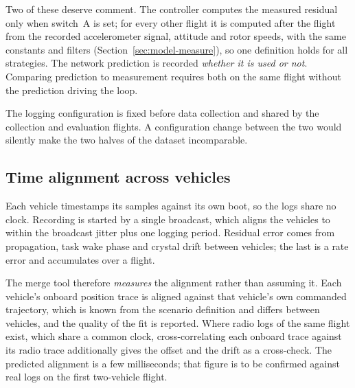 Two of these deserve comment. The controller computes the measured residual only when switch~A is
set; for every other flight it is computed after the flight from the recorded accelerometer signal,
attitude and rotor speeds, with the same constants and filters (Section~\ref{sec:model-measure}),
so one definition holds for all strategies. The network prediction is recorded \emph{whether it is
used or not}. Comparing prediction to measurement requires both on the same flight without the
prediction driving the loop.

The logging configuration is fixed before data collection and shared by the collection and
evaluation flights. A configuration change between the two would silently make the two halves of
the dataset incomparable.

\subsection{Time alignment across vehicles}

Each vehicle timestamps its samples against its own boot, so the logs share no clock. Recording is
started by a single broadcast, which aligns the vehicles to within the broadcast jitter plus one
logging period. Residual error comes from propagation, task wake phase and crystal drift between
vehicles; the last is a rate error and accumulates over a flight.

The merge tool therefore \emph{measures} the alignment rather than assuming it. Each vehicle's
onboard position trace is aligned against that vehicle's own commanded trajectory, which is known
from the scenario definition and differs between vehicles, and the quality of the fit is reported.
Where radio logs of the same flight exist, which share a common clock, cross-correlating each
onboard trace against its radio trace additionally gives the offset and the drift as a
cross-check. The predicted alignment is a few milliseconds; that figure is to be confirmed
against real logs on the first two-vehicle flight.

